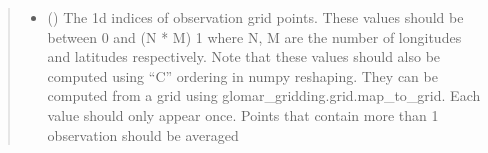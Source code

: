 \documentclass[letterpaper,10pt,english]{sphinxmanual}
\begin{document}
\begin{fulllineitems}
\begin{fulllineitems}
\begin{quote}
\begin{description}
\begin{itemize}
\item {}
\sphinxAtStartPar
{} (\sphinxstyleliteralemphasis{\sphinxupquote{{[}}}\sphinxstyleliteralemphasis{\sphinxupquote{{]} }}\sphinxstyleliteralemphasis{\sphinxupquote{| }}\sphinxstyleliteralemphasis{\sphinxupquote{{[}}}\sphinxstyleliteralemphasis{\sphinxupquote{{]}}}) \textendash{} The 1d indices of observation grid points. These values should be
between 0 and (N * M) \sphinxhyphen{} 1 where N, M are the number of longitudes
and latitudes respectively. Note that these values should also be
computed using “C” ordering in numpy reshaping. They can be
computed from a grid using glomar\_gridding.grid.map\_to\_grid. Each
value should only appear once. Points that contain more than 1
observation should be averaged

\end{itemize}

\sphinxAtStartPar
{}

\end{description}\end{quote}

\end{fulllineitems}



\end{fulllineitems}
\end{document}

